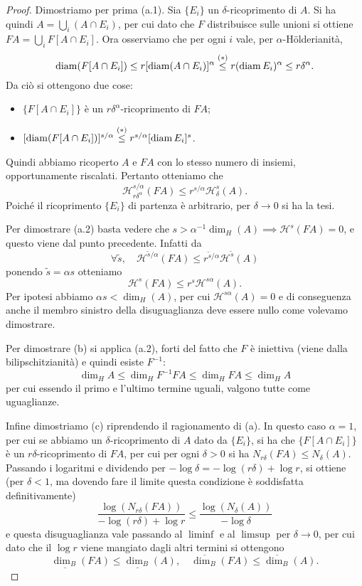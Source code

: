 \begin{proof}
	Dimostriamo per prima (a.1). Sia $\{E_{i}\}$ un $\delta$-ricoprimento di $A$. 
	Si ha quindi $A = \bigcup_{i}(A\cap E_{i})$, per cui dato che $F$ distribuisce sulle unioni si ottiene $FA = \bigcup_{i}F[A\cap E_{i}]$. 
	Ora osserviamo che per ogni $i$ vale, per $\alpha$-Hölderianità, 
	$$\operatorname{diam}(F[A\cap E_{i}]) \leq r [\operatorname{diam}(A\cap E_{i})]^{\alpha} \overset{(*)}{\leq} r (\operatorname{diam} E_{i})^{\alpha} \leq r\delta^{\alpha}.$$
	Da ciò si ottengono due cose: 
	\begin{itemize}
		\item $\{F[A\cap E_{i}]\}$ è un $r\delta^{\alpha}$-ricoprimento di $FA$; 
		\item $[\operatorname{diam}(F[A\cap E_{i}])]^{s/\alpha}\overset{(*)}{\leq} r^{s/\alpha}[\operatorname{diam} E_{i}]^{s}$.
	\end{itemize}
	Quindi abbiamo ricoperto $A$ e $FA$ con lo stesso numero di insiemi, opportunamente riscalati. 
	Pertanto otteniamo che 
	$$\mathcal H^{s/\alpha}_{r\delta^{\alpha}}(FA) \leq r^{s/\alpha} \mathcal H^{s}_{\delta}(A).$$
	Poiché il ricoprimento $\{E_{i}\}$ di partenza è arbitrario, per $\delta\to0$ si ha la tesi.
	
	Per dimostrare (a.2) basta vedere che $s>\alpha^{-1}\dim_{H}(A)\implies\mathcal H^{s}(FA) = 0$, e questo viene dal punto precedente. Infatti da 
	$$\forall\tilde s,\quad \mathcal H^{\tilde s/\alpha}(FA) \leq r^{\tilde s/\alpha} \mathcal H^{\tilde s}(A)$$
	ponendo $\tilde s = \alpha s$ otteniamo 
	$$\mathcal H^{s}(FA) \leq r^{s}\mathcal H^{s\alpha}(A).$$
	Per ipotesi abbiamo $\alpha s<\dim_{H}(A)$, per cui $\mathcal H^{s\alpha}(A) = 0$ e di conseguenza anche il membro sinistro della disuguaglianza deve essere nullo come volevamo dimostrare. 
	
	Per dimostrare (b) si applica (a.2), forti del fatto che $F$ è iniettiva (viene dalla bilipschitzianità) e quindi esiste $F^{-1}$: 
	$$\dim_{H}A \leq \dim_{H}F^{-1}FA \leq \dim_{H}FA \leq \dim_{H}A$$
	per cui essendo il primo e l'ultimo termine uguali, valgono tutte come uguaglianze. 
	
	Infine dimostriamo (c) riprendendo il ragionamento di (a). In questo caso $\alpha = 1$, per cui se abbiamo un $\delta$-ricoprimento di $A$ dato da $\{E_{i}\}$, si ha che $\{F[A\cap E_{i}]\}$ è un $r\delta$-ricoprimento di $FA$, per cui per ogni $\delta>0$ si ha $N_{r\delta}(FA)\leq N_{\delta}(A)$. 
	Passando i logaritmi e dividendo per $-\log\delta = -\log(r\delta) + \log r$, si ottiene (per $\delta<1$, ma dovendo fare il limite questa condizione è soddisfatta definitivamente)
	$$\frac{\log(N_{r\delta}(FA))}{-\log(r\delta) + \log r}\leq \frac{\log(N_{\delta}(A))}{-\log\delta}$$
	e questa disuguaglianza vale passando al $\liminf$ e al $\limsup$ per $\delta\to0$, per cui dato che il $\log r$ viene mangiato dagli altri termini si ottengono 
	$$\underline{\dim_{B}}(FA)\leq\underline{\dim_{B}}(A),\quad \overline{\dim_{B}}(FA)\leq\overline{\dim_{B}}(A).$$
\end{proof}

